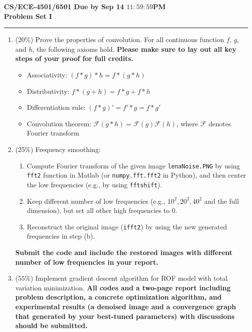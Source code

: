\documentclass[11pt]{article}
\begin{document}
\thispagestyle{empty}
{\large{\bf CS/ECE-4501/6501  \hfill Due by Sep 14 $11:59:59$PM}}\\

{\LARGE{\bf Problem Set I}}
\vspace{0.2\baselineskip}
\hrule

\begin{enumerate}

\item ($20\%$) Prove the properties of convolution. For all continuous function $f$, $g$, and $h$, the following axioms hold. {\bf Please make sure to lay out all key steps of your proof for full credits.} 
\begin{itemize}
 \item Associativity: $(f*g)*h = f*(g*h)$
 \item Distributivity: $f*(g+h) = f*g + f*h$
 \item Differentiation rule: $(f*g)' = f'*g = f * g'$
 \item Convolution theorem: $\mathcal{F}(g*h) = \mathcal{F}(g) \mathcal{F}(h)$, where $\mathcal{F}$
 denotes Fourier transform
\end{itemize}

\item ($25\%$) Frequency smoothing: 
\begin{enumerate}
\item Compute Fourier transform of the given image
{\tt lenaNoise.PNG} by using {\tt fft2} function in Matlab (or {\tt numpy.fft.fft2} in Python), and then center the low frequencies (e.g., by using {\tt fftshift}).
\item Keep different number of low frequencies (e.g., $10^2, 20^2, 40^2$ and the full dimension), 
but set all other high frequencies to $0$.
\item Reconstruct the original image ({\tt ifft2}) by using the new generated frequencies in step (b).
\end{enumerate}
{\bf Submit the code and include the restored images with different number of low frequencies in your report.}

\item ($55\%$) Implement gradient descent algorithm for ROF model with total variation minimization. {\bf All codes and a two-page report including problem description, a concrete optimization algorithm, and experimental results (a denoised image and a convergence graph that generated by your best-tuned parameters) with discussions should be submitted.}  


\end{enumerate}
\end{document}
